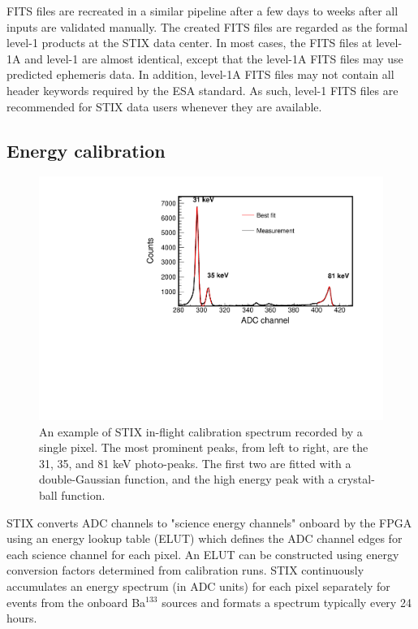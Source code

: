 \documentclass[referee]{preaa} %
\begin{document}
FITS files are recreated 
in a similar pipeline after a few days to weeks after all inputs are validated manually. The created FITS files are regarded as the formal level-1 products at the STIX data center. 
In most cases, the FITS files at level-1A and level-1 are almost identical, except that the level-1A FITS files may use predicted ephemeris data. In addition, level-1A FITS files may not contain all header keywords required by the ESA standard.  As such, level-1 FITS files are recommended for STIX data users whenever they are available. 

\subsection{Energy calibration}
\begin{figure}
 \centering
  \includegraphics[width=0.8\linewidth]{figures/cal-fit.pdf}
  \caption{An example of  STIX in-flight calibration spectrum recorded by a single pixel.
  The most prominent peaks, from left to right, are the 31, 35, and 81 keV photo-peaks. The first two are fitted with a double-Gaussian function, and the high energy peak with a crystal-ball function. }
    \label{fig:cal-fit}
\end{figure}
STIX converts ADC channels to "science energy channels" onboard by the FPGA using an energy lookup table (ELUT) 
which defines the ADC channel edges for each science channel for each pixel.
An ELUT can be constructed using energy conversion factors determined from calibration runs. 
STIX continuously accumulates an energy spectrum (in ADC units) for each pixel separately for events from the onboard Ba$^{133}$ sources and formats a spectrum typically every 24 hours. 
\end{document}
